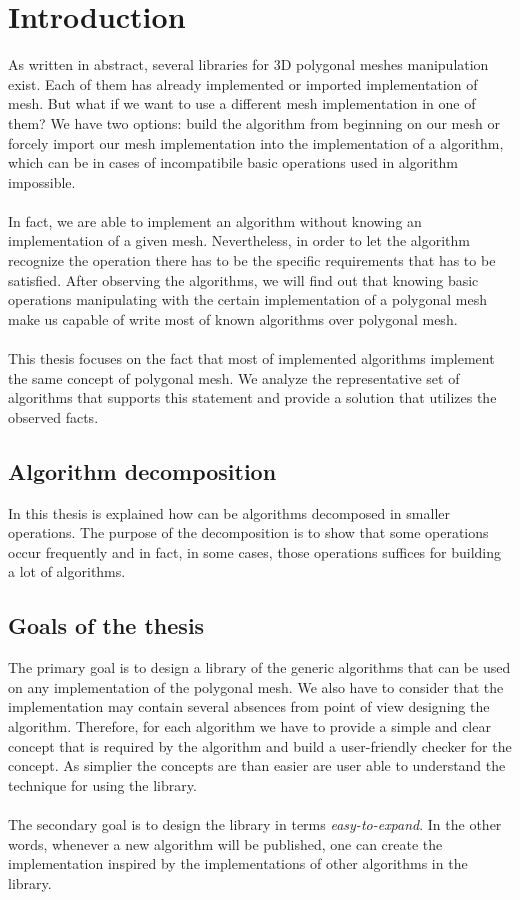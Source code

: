 \chapter*{Introduction}

As written in abstract, several libraries for 3D polygonal meshes manipulation exist.
Each of them has already implemented or imported implementation of mesh. But what if we want to use
a different mesh implementation in one of them? We have two options: build
the algorithm from beginning on our mesh or forcely import our mesh implementation into
the implementation of a algorithm, which can be in cases of incompatibile basic operations
used in algorithm impossible.\\
\\
In fact, we are able to implement an algorithm without knowing an implementation of
a given mesh. Nevertheless, in order to let the algorithm recognize the operation there
has to be the specific requirements that has to be satisfied.
After observing the algorithms, we will find out that
knowing basic operations manipulating with the certain implementation of a polygonal mesh
make us capable of write most of known algorithms over polygonal mesh.\\
\\
This thesis focuses on the fact that most of implemented algorithms implement the
same concept of polygonal mesh. We analyze the representative set of algorithms that
supports this statement and provide a solution that utilizes the observed facts.

\section*{Algorithm decomposition}

In this thesis is explained how can be algorithms decomposed in smaller operations.
The purpose of the decomposition is to show that some operations occur frequently
and in fact, in some cases, those operations suffices for building a lot of algorithms.

\section*{Goals of the thesis}

The primary goal is to design a library of the generic algorithms that can be used on any
implementation of the polygonal mesh. We also have to consider that the implementation
may contain several absences from point of view designing the algorithm. Therefore, for each
algorithm we have to provide a simple and clear concept that is required by the algorithm
and build a user-friendly checker for the concept. As simplier the concepts are than easier
are user able to understand the technique for using the library.\\
\\
The secondary goal is to design the library in terms \emph{easy-to-expand}. In the other words,
whenever a new algorithm will be published, one can create the implementation inspired
by the implementations of other algorithms in the library.

